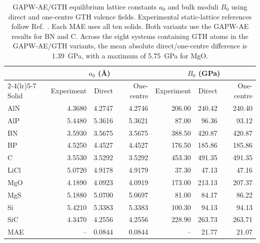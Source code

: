 \documentclass[10pt,a4paper]{article}
\begin{document}
\begin{table}[t]
\centering
\small
\caption{GAPW-AE/GTH equilibrium lattice constants $a_0$ and bulk moduli $B_0$ using direct and one-centre GTH valence fields. Experimental static-lattice references follow Ref.~. Each MAE uses all ten solids. Both variants use the GAPW-AE results for BN and C. Across the eight systems containing GTH atoms in the GAPW-AE/GTH variants, the mean absolute direct/one-centre difference is 1.39~GPa, with a maximum of 5.75~GPa for MgO.}
\label{tab:lc10-reconstruction}
\begin{tabular}{lrrrrrr}
\toprule
& \multicolumn{3}{c}{$a_0$ (\AA{})} & \multicolumn{3}{c}{$B_0$ (GPa)} \\
\cmidrule(lr){2-4}\cmidrule(lr){5-7}
Solid & Experiment & Direct & One-centre & Experiment & Direct & One-centre \\
\midrule
AlN & 4.3680 & 4.2747 & 4.2746 & 206.00 & 240.42 & 240.40 \\
AlP & 5.4480 & 5.3616 & 5.3621 & 87.00 & 96.36 & 93.12 \\
BN & 3.5930 & 3.5675 & 3.5675 & 388.50 & 420.87 & 420.87 \\
BP & 4.5250 & 4.4527 & 4.4527 & 176.50 & 185.86 & 185.86 \\
C & 3.5530 & 3.5292 & 3.5292 & 453.30 & 491.35 & 491.35 \\
LiCl & 5.0720 & 4.9178 & 4.9179 & 37.30 & 47.13 & 47.16 \\
MgO & 4.1890 & 4.0923 & 4.0919 & 173.00 & 213.13 & 207.37 \\
MgS & 5.1880 & 5.0700 & 5.0697 & 81.00 & 84.17 & 86.22 \\
Si & 5.4210 & 5.3383 & 5.3383 & 100.30 & 94.13 & 94.13 \\
SiC & 4.3470 & 4.2556 & 4.2556 & 228.90 & 263.73 & 263.71 \\
\midrule
MAE & -- & 0.0844 & 0.0844 & -- & 21.77 & 21.07 \\
\bottomrule
\end{tabular}
\end{table}
\end{document}
